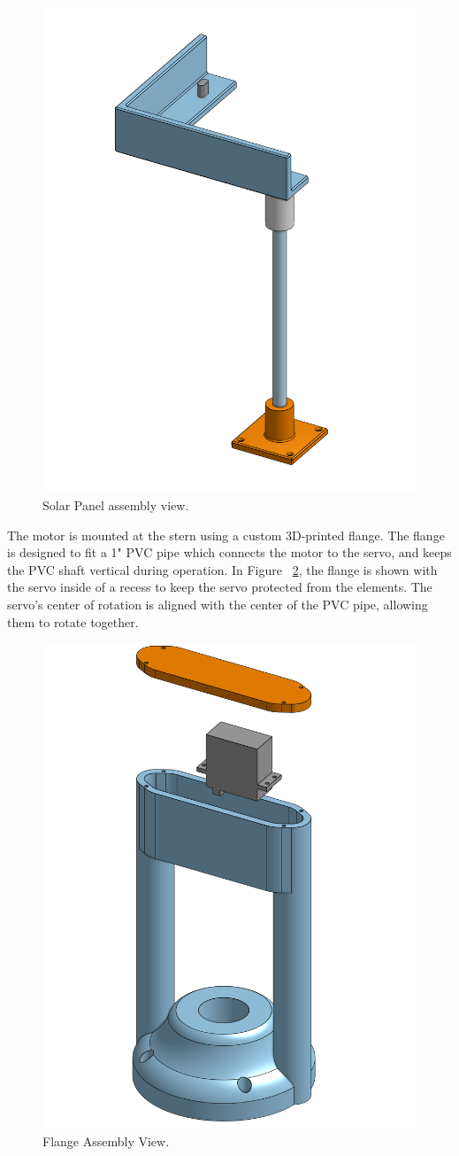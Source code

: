 \begin{figure}[htbp]        %
    \centering
    \includegraphics[width=0.4\linewidth]{"Solar_Panel_Assembly.png"}
    \caption{Solar Panel assembly view.}
    \label{fig:solar-panel}
\end{figure}

The motor is mounted at the stern using a custom 3D-printed flange. The flange is designed to fit a 1" PVC pipe which connects the motor to the servo, and keeps the PVC shaft vertical during operation. In Figure ~\ref{fig:flange}, the flange is shown with the servo inside of a recess to keep the servo protected from the elements. The servo's center of rotation is aligned with the center of the PVC pipe, allowing them to rotate together. 

\begin{figure}[htbp]        %
    \centering
    \includegraphics[width=0.4\linewidth]{"Flange_Assembly.png"}
    \caption{Flange Assembly View.}
    \label{fig:flange}
\end{figure}

